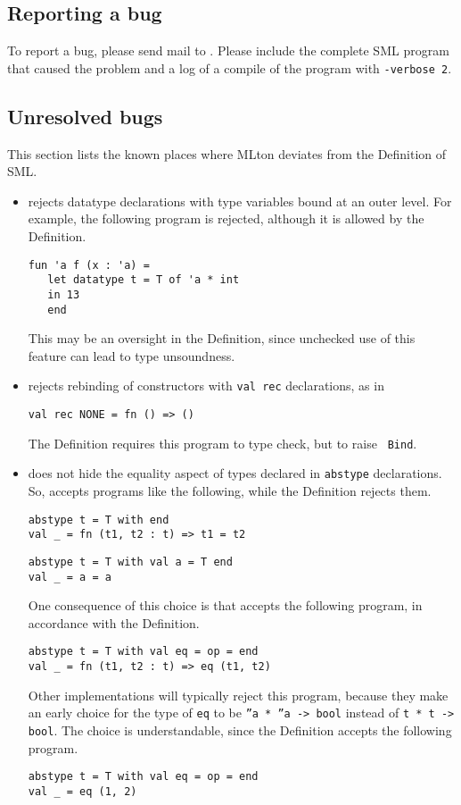 %
\subsection{Reporting a bug}

To report a bug, please send mail to {\mltonmail}.  Please include the
complete SML program that caused the problem and a log of a compile of
the program with {\tt -verbose 2}.
%
\subsection{Unresolved bugs}

This section lists the known places where MLton deviates from the
Definition of SML.

\begin{itemize}

\item
{\mlton} rejects datatype declarations with type variables bound at
an outer level.  For example, the following program is rejected,
although it is allowed by the Definition.
\begin{verbatim}
fun 'a f (x : 'a) =
   let datatype t = T of 'a * int
   in 13
   end
\end{verbatim}
This may be an oversight in the Definition, since unchecked use of
this feature can lead to type unsoundness.

\item
{\mlton} rejects rebinding of constructors with {\tt val rec}
declarations, as in
\begin{verbatim}
val rec NONE = fn () => ()
\end{verbatim}
The Definition requires this program to type check, but to raise {\tt
Bind}.

\item
{\mlton} does not hide the equality aspect of types declared in
{\tt abstype} declarations.  So, {\mlton} accepts programs like the
following, while the Definition rejects them.
\begin{verbatim}
abstype t = T with end
val _ = fn (t1, t2 : t) => t1 = t2
\end{verbatim}

\begin{verbatim}
abstype t = T with val a = T end
val _ = a = a
\end{verbatim}

One consequence of this choice is that {\mlton} accepts the following
program, in accordance with the Definition.
\begin{verbatim}
abstype t = T with val eq = op = end
val _ = fn (t1, t2 : t) => eq (t1, t2)
\end{verbatim}
Other implementations will typically reject this program, because they
make an early choice for the type of {\tt eq} to be {\tt ''a * ''a ->
bool} instead of {\tt t * t -> bool}.  The choice is understandable,
since the Definition accepts the following program.
\begin{verbatim}
abstype t = T with val eq = op = end
val _ = eq (1, 2)
\end{verbatim}

\end{itemize}
